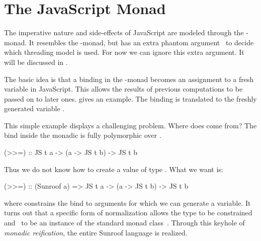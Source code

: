  
\section{The JavaScript Monad}
\label{sec:js-monad}

The imperative nature and side-effects of JavaScript are 
modeled through the \JS-monad. It resembles the \IO-monad, 
but has an extra phantom argument~\cite{Leijen:99:Phantom} 
to decide which threading model is used. 
For now we can ignore this extra argument. It will be
discussed in .

The basic idea is that a binding in the \JS-monad becomes an
assignment to a fresh variable in JavaScript. 
This allows the results of previous computations to be passed on to 
later ones.
 gives an example.
The binding  is translated to the freshly generated
variable .

This simple example displays a challenging problem. Where does
 come from? The bind inside the monadic  is
fully polymorphic over .
\begin{Code}
(>>=) :: JS t a -> (a -> JS t b) -> JS t b
\end{Code}
Thus we do not know how to create a value of type . What we want is:
\begin{Code}
(>>=) :: (Sunroof a) => JS t a -> (a -> JS t b) -> JS t b
\end{Code}
where  constrains the bind to
arguments for which we can generate a variable.
It turns out that a specific form of normalization allows 
the type  to be constrained and \JS~to 
be an instance of the standard monad class~\cite{Sculthorpe:13:ConstrainedMonads}.
Through this keyhole of {\em monadic reification},
the entire Sunroof language is realized. 

